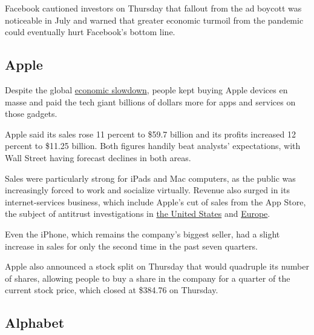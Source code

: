 Facebook cautioned investors on Thursday that fallout from the ad
boycott was noticeable in July and warned that greater economic turmoil
from the pandemic could eventually hurt Facebook's bottom line.

\hypertarget{apple}{%
\subsection{Apple}\label{apple}}

Despite the global
\href{https://slack-redir.net/link?url=https\%3A\%2F\%2Fwww.nytimes3xbfgragh.onion\%2Flive\%2F2020\%2F07\%2F30\%2Fbusiness\%2Fstock-market-today-coronavirus\%2Fthe-us-economys-contraction-in-the-second-quarter-was-the-worst-on-record}{economic
slowdown}, people kept buying Apple devices en masse and paid the tech
giant billions of dollars more for apps and services on those gadgets.

Apple said its sales rose 11 percent to \$59.7 billion and its profits
increased 12 percent to \$11.25 billion. Both figures handily beat
analysts' expectations, with Wall Street having forecast declines in
both areas.

Sales were particularly strong for iPads and Mac computers, as the
public was increasingly forced to work and socialize virtually. Revenue
also surged in its internet-services business, which include Apple's cut
of sales from the App Store, the subject of antitrust investigations in
\href{https://slack-redir.net/link?url=https\%3A\%2F\%2Fwww.nytimes3xbfgragh.onion\%2F2020\%2F07\%2F28\%2Ftechnology\%2Famazon-apple-facebook-google-antitrust-hearing.html}{the
United States} and
\href{https://slack-redir.net/link?url=https\%3A\%2F\%2Fwww.nytimes3xbfgragh.onion\%2F2020\%2F06\%2F16\%2Fbusiness\%2Fapple-app-store-european-union-antitrust.html}{Europe}.

Even the iPhone, which remains the company's biggest seller, had a
slight increase in sales for only the second time in the past seven
quarters.

Apple also announced a stock split on Thursday that would quadruple its
number of shares, allowing people to buy a share in the company for a
quarter of the current stock price, which closed at \$384.76 on
Thursday.

\hypertarget{alphabet}{%
\subsection{Alphabet}\label{alphabet}}

